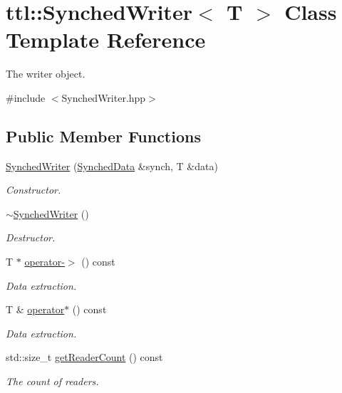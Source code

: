 \hypertarget{classttl_1_1_synched_writer}{\section{ttl\-:\-:Synched\-Writer$<$ T $>$ Class Template Reference}
\label{classttl_1_1_synched_writer}
}


The writer object.  




{\ttfamily \#include $<$Synched\-Writer.\-hpp$>$}

\subsection*{Public Member Functions}
\begin{DoxyCompactItemize}
\item 
\hyperlink{classttl_1_1_synched_writer_a92bf3baf1b202821c444f79d022e1b09}{Synched\-Writer} (\hyperlink{structttl_1_1_synched_data}{Synched\-Data} \&synch, T \&data)
\begin{DoxyCompactList}\small\item\em Constructor. \end{DoxyCompactList}\item 
\hyperlink{classttl_1_1_synched_writer_ad1e6ce98f64b6fe795fc0d494f31e3e6}{$\sim$\-Synched\-Writer} ()
\begin{DoxyCompactList}\small\item\em Destructor. \end{DoxyCompactList}\item 
T $\ast$ \hyperlink{classttl_1_1_synched_writer_a6e950187065bef4f7cfc2676aeb95bf2}{operator-\/$>$} () const 
\begin{DoxyCompactList}\small\item\em Data extraction. \end{DoxyCompactList}\item 
T \& \hyperlink{classttl_1_1_synched_writer_a18c28ccf03de11401953bfdf71a361a9}{operator$\ast$} () const 
\begin{DoxyCompactList}\small\item\em Data extraction. \end{DoxyCompactList}\item 
std\-::size\-\_\-t \hyperlink{classttl_1_1_synched_writer_ae9251cbb08ac342528365c8103db30ee}{get\-Reader\-Count} () const 
\begin{DoxyCompactList}\small\item\em The count of readers. \end{DoxyCompactList}\end{DoxyCompactItemize}


